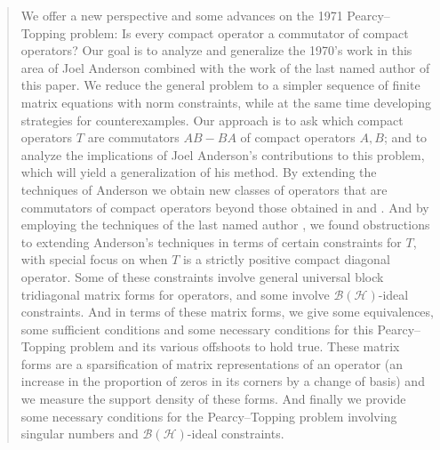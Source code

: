 \documentclass[10pt,reqno]{amsart}
\theoremstyle{remark}
\newcommand{\BH}{\mathcal{B}(\Hil)}
\newcommand{\Hil}{\mathcal{H}}
\numberwithin{equation}{section}
\begin{document}
\begin{abstract}
  We offer a new perspective and some advances on the 1971 Pearcy--Topping problem: Is every compact operator a commutator of compact operators?
  Our goal is to analyze and generalize the 1970's work in this area of Joel Anderson combined with the work of the last named author of this paper.
  We reduce the general problem to a simpler sequence of finite matrix equations with norm constraints, while at the same time developing strategies for counterexamples.
  Our approach is to ask which compact operators $T$ are commutators $AB-BA$ of compact operators $A,B$; and to analyze the implications of Joel Anderson's contributions to this problem, which will yield a generalization of his method.
  By extending the techniques of Anderson \cite{And-1977-JRAM}  we obtain new classes of operators that are commutators of compact operators beyond those obtained in \cite{Pat-2012} and \cite{BPW-2014-VLOT}.
  And by employing the techniques of the last named author \cite{Wei-1980-IEOT}, we found obstructions to extending Anderson's techniques in terms of certain constraints for $T$, with special focus on when $T$ is a strictly positive compact diagonal operator.
  Some of these constraints involve general universal block tridiagonal matrix forms for operators, and some involve $\BH$-ideal constraints.
  And in terms of these matrix forms, we give some equivalences, some sufficient conditions and some necessary conditions for this Pearcy--Topping problem and its various offshoots to hold true.
  These matrix forms are a sparsification of matrix representations of an operator (an increase in the proportion of zeros in its corners by a change of basis) and we measure the support density of these forms.
  And finally we provide some necessary conditions for the Pearcy--Topping problem involving singular numbers and $\BH$-ideal constraints.
\end{abstract}
\end{document}
